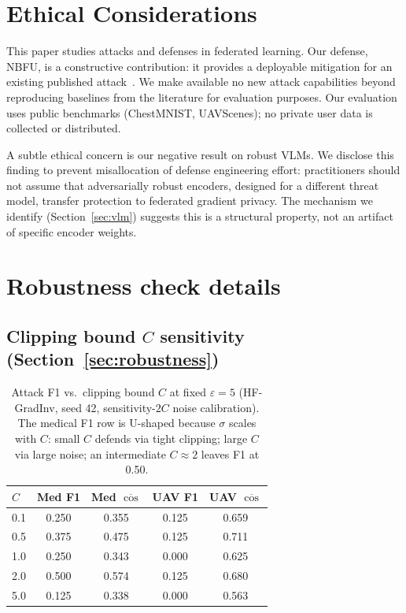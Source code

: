 \documentclass[11pt]{article}
\begin{document}
\section*{Ethical Considerations}

This paper studies attacks and defenses in federated learning. Our defense, NBFU, is a constructive contribution: it provides a deployable mitigation for an existing published attack~\citep{geminio2024}. We make available no new attack capabilities beyond reproducing baselines from the literature for evaluation purposes. Our evaluation uses public benchmarks (ChestMNIST, UAVScenes); no private user data is collected or distributed.

A subtle ethical concern is our negative result on robust VLMs. We disclose this finding to prevent misallocation of defense engineering effort: practitioners should not assume that adversarially robust encoders, designed for a different threat model, transfer protection to federated gradient privacy. The mechanism we identify (Section~\ref{sec:vlm}) suggests this is a structural property, not an artifact of specific encoder weights.




\appendix

\section{Robustness check details}
\label{app:robust}

\subsection{Clipping bound $C$ sensitivity (Section~\ref{sec:robustness})}
\begin{table}[h]
\centering
\small
\begin{tabular}{lcccc}
\toprule
$C$ & Med F1 & Med $\overline{\cos}$ & UAV F1 & UAV $\overline{\cos}$ \\
\midrule
0.1 & 0.250 & 0.355 & 0.125 & 0.659 \\
0.5 & 0.375 & 0.475 & 0.125 & 0.711 \\
1.0 & 0.250 & 0.343 & 0.000 & 0.625 \\
2.0 & 0.500 & 0.574 & 0.125 & 0.680 \\
5.0 & 0.125 & 0.338 & 0.000 & 0.563 \\
\bottomrule
\end{tabular}
\caption{Attack F1 vs.\ clipping bound $C$ at fixed $\varepsilon{=}5$ (HF-GradInv, seed 42, sensitivity-$2C$ noise calibration). The medical F1 row is U-shaped because $\sigma$ scales with $C$: small $C$ defends via tight clipping; large $C$ via large noise; an intermediate $C{\approx}2$ leaves F1 at 0.50.}
\label{tab:csens}
\end{table}
\end{document}

